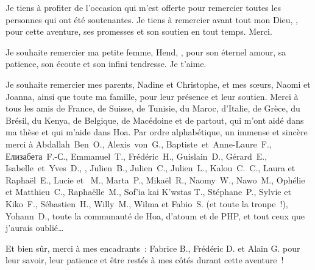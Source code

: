  Je tiens à profiter de l'occasion qui m'est
offerte pour remercier toutes les personnes qui ont été soutenantes. Je tiens à
remercier avant tout mon Dieu, , pour cette aventure,
ses promesses et son soutien en tout temps. Merci.

Je souhaite remercier ma petite femme, Hend, , pour son
éternel amour, sa patience, son écoute et son infini tendresse. Je t'aime.

Je souhaite remercier mes parents, Nadine et Christophe, et mes sœurs, Naomi et
Joanna, ainsi que toute ma famille, pour leur présence et leur soutien.
%
Merci à tous les amis de France, de Suisse, de Tunisie, du Maroc, d'Italie, de
Grèce, du Brésil, du Kenya, de Belgique, de Macédoine et de partout, qui m'ont aidé dans ma
thèse et qui m'aide dans Hoa. Par ordre alphabétique, un immense et sincère
merci à
Abdallah~Ben~O.,
Alexis~von~G.,
Baptiste~et~Anne-Laure~F.,
\foreignlanguage{russian}{Елизабета}~F.-\foreignlanguage{russian}{С}.,
Emmanuel~T.,
Frédéric~H.,
Guislain~D.,
Gérard~E.,
Isabelle~et~Yves~D.,
,
Julien~B.,
Julien~C.,
Julien~L.,
Kalou~C.~C.,
Laura et Raphaël~E.,
Lucie et ~M.,
Marta~P.,
Mikaël~R.,
\foreignlanguage{english}{Naomy~W.},
Nawo~M.,
Ophélie et Matthieu~C.,
Raphaëlle~M.,
\foreignlanguage{greek}{\textgreek{Sof'ia kai K'wstas T.}},
Stéphane~P.,
Sylvie et Kiko~F.,
Sébastien~H.,
Willy~M.,
Wilma et \foreignlanguage{italian}{Fabio}~S. (et toute la troupe~!),
Yohann~D.,
toute la communauté de Hoa, d'atoum et de PHP,
et tout ceux que j'aurais oublié…

Et bien sûr, merci à mes encadrants~: Fabrice B., Frédéric D. et Alain G. pour
leur savoir, leur patience et être restés à mes côtés durant cette aventure~!

